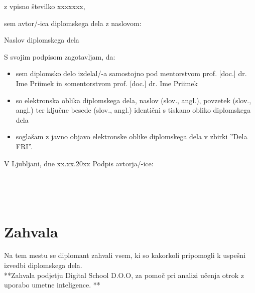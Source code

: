 \documentclass[12pt,a4paper]{book}
\begin{document}
\vspace{0.5cm}
z vpisno številko \hspace{0.5cm} xxxxxxx,

\vspace{1cm}
sem avtor/-ica diplomskega dela z naslovom:
   
\vspace{0.5cm}
Naslov diplomskega dela

\vspace{1.5cm}
S svojim podpisom zagotavljam, da:
\begin{itemize}
    \item sem diplomsko delo izdelal/-a samostojno pod mentorstvom prof. [doc.] dr. Ime Priimek in somentorstvom prof. [doc.] dr. Ime Priimek
    \item so elektronska oblika diplomskega dela, naslov (slov., angl.), povzetek (slov., angl.) ter ključne besede (slov., angl.) identični s tiskano obliko diplomskega dela
    \item soglašam z javno objavo elektronske oblike diplomskega dela v zbirki ''Dela FRI''.
\end{itemize}

\vspace{1cm}
V Ljubljani, dne xx.xx.20xx \hspace{1cm} Podpis avtorja/-ice:

\newpage 


\ \thispagestyle{empty}

\newpage
\ \thispagestyle{empty}



\chapter*{Zahvala}

\thispagestyle{empty}

Na tem mestu se diplomant zahvali vsem, ki so kakorkoli pripomogli k uspešni izvedbi diplomskega dela.
\\**Zahvala podjetju Digital School D.O.O, za pomoč pri analizi učenja otrok z uporabo umetne inteligence. **


\newpage

\end{document}
